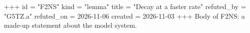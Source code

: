 +++
id = "F2NS"
kind = "lemma"
title = "Decay at a faster rate"
refuted_by = "G5TZ.a"
refuted_on = 2026-11-06
created = 2026-11-03
+++
Body of F2NS: a made-up statement about the model system.
